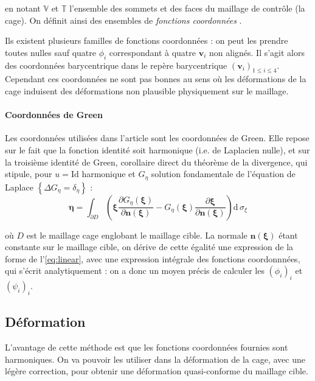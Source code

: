 \documentclass[10pt,a4paper]{article}
\begin{document}
en notant $\mathbb{V}$ et $\mathbb{T}$ l'ensemble des sommets et des faces du maillage de contrôle (la cage). On définit ainsi des ensembles de \textit{fonctions coordonnées} .

Ils existent plusieurs familles de fonctions coordonnées : on peut les prendre toutes nulles sauf quatre $\phi_i$ correspondant à quatre $\mathbf{v}_i$ non alignés. Il s'agit alors des coordonnées barycentrique dans le repère barycentrique $\left( \mathbf{v}_i \right)_{1 \leq i \leq 4}$. Cependant ces coordonnées ne sont pas bonnes au sens où les déformations de la cage induisent des déformations non plausible physiquement sur le maillage.

\paragraph{Coordonnées de Green}Les coordonnées utilisées dans l'article sont les coordonnées de Green. Elle repose sur le fait que la fonction identité soit harmonique (i.e. de Laplacien nulle), et sur la troisième identité de Green, corollaire direct du théorème de la divergence, qui stipule, pour $u = \mathrm{Id}$ harmonique et $G_\eta$ solution fondamentale de l'équation de Laplace $\left\lbrace \Delta G_\eta = \delta_\eta \right\rbrace$ :
\begin{equation}
\boldsymbol\eta = \int_{\partial D} \left(
	\boldsymbol\xi
		\frac{\partial G_\eta \left(\boldsymbol\xi \right)}
		{\partial \mathbf{n \left( \boldsymbol\xi \right)}}
	- G_\eta \left( \boldsymbol\xi \right) 
		\frac{\partial \boldsymbol\xi }
		{\partial \mathbf{n \left( \boldsymbol\xi \right)}}
\right)
\mathrm{d}\, \sigma_\xi
\end{equation}

où $D$ est le maillage cage englobant le maillage cible. La normale $\mathbf{n \left( \boldsymbol\xi \right)}$ étant constante sur le maillage cible, on dérive de cette égalité une expression de la forme de l'\autoref{eq:linear}, avec une expression intégrale des fonctions coordonnnées, qui s'écrit analytiquement : on a donc un moyen précis de calculer les $\left( \phi_i \right)_i$ et $\left( \psi_i \right)_i$.

\subsection{Déformation}

L'avantage de cette méthode est que les fonctions coordonnées fournies sont harmoniques. On va pouvoir les utiliser dans la déformation de la cage, avec une légère correction, pour obtenir une déformation quasi-conforme du maillage cible.
\end{document}
